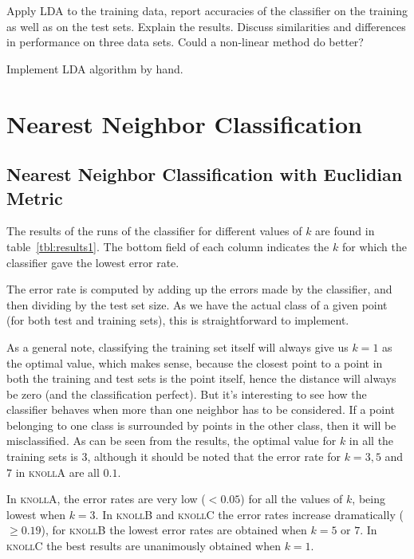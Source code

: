 \documentclass{article}
\newcommand{\knollA}{\textsc{knollA}\xspace}
\newcommand{\knollB}{\textsc{knollB}\xspace}
\newcommand{\knollC}{\textsc{knollC}\xspace}
\begin{document}
Apply LDA to the training data, report accuracies of the classifier on
the training as well as on the test sets. Explain the results. Discuss
similarities and differences in performance on three data sets. Could
a non-linear method do better?

Implement LDA algorithm by hand.

\newpage
\section{Nearest Neighbor Classification}

\subsection{Nearest Neighbor Classification with Euclidian Metric}

The results of the runs of the classifier for different values of $k$
are found in table~\ref{tbl:results1}. The bottom field of each column
indicates the $k$ for which the classifier gave the lowest error rate.

The error rate is computed by adding up the errors made by the
classifier, and then dividing by the test set size. As we have the
actual class of a given point (for both test and training sets), this
is straightforward to implement.

As a general note, classifying the training set itself will always
give us $k = 1$ as the optimal value, which makes sense, because the
closest point to a point in both the training and test sets is the
point itself, hence the distance will always be zero (and the
classification perfect). But it's interesting to see how the
classifier behaves when more than one neighbor has to be
considered. If a point belonging to one class is surrounded by points
in the other class, then it will be misclassified. As can be seen from
the results, the optimal value for $k$ in all the training sets is $3$,
although it should be noted that the error rate for $k = 3,5$ and $7$
in \knollA are all $0.1$.

In \knollA, the error rates are very low ($< 0.05$) for all the values of $k$,
being lowest when $k = 3$. In \knollB and \knollC the error rates
increase dramatically ($\geq 0.19$), for \knollB the lowest error rates are obtained
when $k = 5$ or $7$. In \knollC the best results are unanimously
obtained when $k = 1$.
\end{document}
